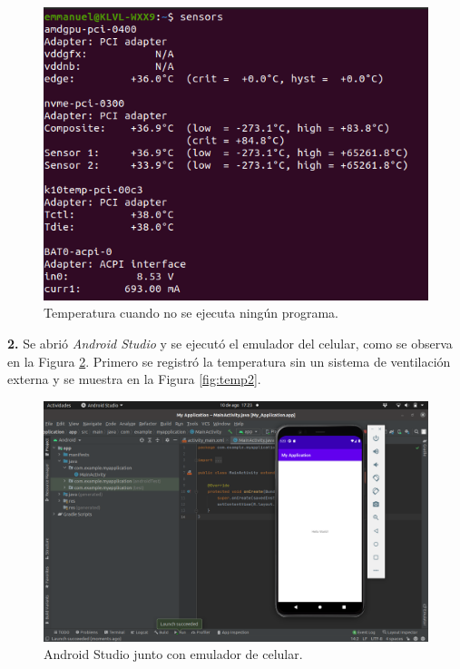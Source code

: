\documentclass{article}
\begin{document}
\begin{figure}[htbp]

\center

\includegraphics[scale=0.5]{imagenes/temp1}

\caption{Temperatura cuando no se ejecuta ningún programa.} \label{fig:so}

\end{figure}

\textbf{2.} Se abrió \textit{Android Studio} y se ejecutó el emulador del celular, como se observa en la Figura \ref{fig:android}. Primero se registró la temperatura sin un sistema de ventilación externa y se muestra en la Figura \ref{fig:temp2}.

\begin{figure}[htbp]

\center

\includegraphics[width=\linewidth]{imagenes/android}

\caption{Android Studio junto con emulador de celular.} \label{fig:android}

\end{figure}
\end{document}
